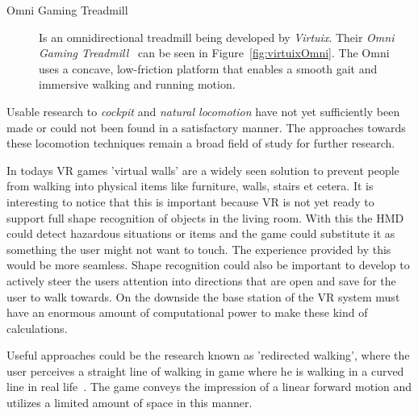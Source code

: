 \begin{description}
	\item[Omni Gaming Treadmill] Is an omnidirectional treadmill being developed by \textit{Virtuix}. Their \textit{Omni Gaming Treadmill~\textcopyright} can be seen in Figure~\ref{fig:virtuixOmni}. The Omni uses a concave, low-friction platform that enables a smooth gait and immersive walking and running motion.~\cite{online:omni}
	
\end{description}

Usable research to \textit{cockpit} and \textit{natural locomotion} have not yet sufficiently been made or could not been found in a satisfactory manner. The approaches towards these locomotion techniques remain a broad field of study for further research. 

In todays VR games 'virtual walls' are a widely seen solution to prevent people from walking into physical items like furniture, walls, stairs et cetera. It is interesting to notice that this is important because VR is not yet ready to support full shape recognition of objects in the living room. With this the HMD could detect hazardous situations or items and the game could substitute it as something the user might not want to touch. The experience provided by this would be more seamless.\newline
Shape recognition could also be important to develop to actively steer the users attention into directions that are open and save for the user to walk towards. On the downside the base station of the VR system must have an enormous amount of computational power to make these kind of calculations.

Useful approaches could be the research known as 'redirected walking', where the user perceives a straight line of walking in game where he is walking in a curved line in real life~\cite{razzaque2001redirected}. The game conveys the impression of a linear forward motion and utilizes a limited amount of space in this manner.

